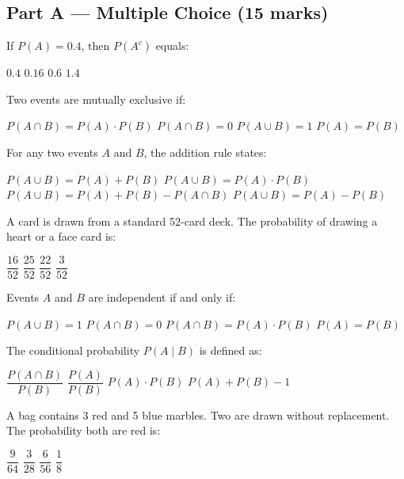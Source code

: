 \documentclass[addpoints]{exam}
\begin{document}
\newpage
\begin{questions}

\section*{Part A --- Multiple Choice (15 marks)}
\vspace{5mm}

\question[1] If $P(A) = 0.4$, then $P(A^c)$ equals:
\begin{choices}
    \choice $0.4$
    \choice $0.16$
    \correctchoice $0.6$
    \choice $1.4$
\end{choices}

\question[1] Two events are mutually exclusive if:
\begin{choices}
    \choice $P(A \cap B) = P(A) \cdot P(B)$
    \correctchoice $P(A \cap B) = 0$
    \choice $P(A \cup B) = 1$
    \choice $P(A) = P(B)$
\end{choices}

\question[1] For any two events $A$ and $B$, the addition rule states:
\begin{choices}
    \choice $P(A \cup B) = P(A) + P(B)$
    \choice $P(A \cup B) = P(A) \cdot P(B)$
    \correctchoice $P(A \cup B) = P(A) + P(B) - P(A \cap B)$
    \choice $P(A \cup B) = P(A) - P(B)$
\end{choices}

\question[1] A card is drawn from a standard 52-card deck. The probability of drawing a
heart or a face card is:
\begin{choices}
    \choice $\dfrac{16}{52}$
    \choice $\dfrac{25}{52}$
    \correctchoice $\dfrac{22}{52}$
    \choice $\dfrac{3}{52}$
\end{choices}

\question[1] Events $A$ and $B$ are independent if and only if:
\begin{choices}
    \choice $P(A \cup B) = 1$
    \choice $P(A \cap B) = 0$
    \correctchoice $P(A \cap B) = P(A) \cdot P(B)$
    \choice $P(A) = P(B)$
\end{choices}

\question[1] The conditional probability $P(A \mid B)$ is defined as:
\begin{choices}
    \correctchoice $\dfrac{P(A \cap B)}{P(B)}$
    \choice $\dfrac{P(A)}{P(B)}$
    \choice $P(A) \cdot P(B)$
    \choice $P(A) + P(B) - 1$
\end{choices}

\question[1] A bag contains 3 red and 5 blue marbles. Two are drawn without replacement.
The probability both are red is:
\begin{choices}
    \choice $\dfrac{9}{64}$
    \correctchoice $\dfrac{3}{28}$
    \choice $\dfrac{6}{56}$
    \choice $\dfrac{1}{8}$
\end{choices}


\end{questions}
\end{document}

